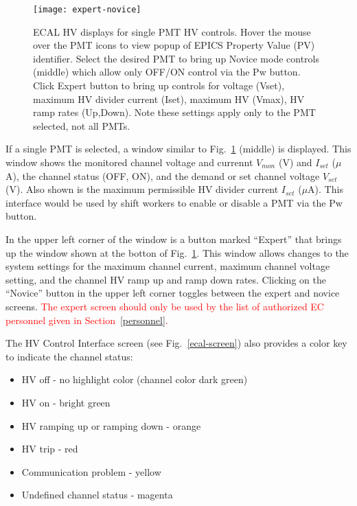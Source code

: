\documentclass[letterpaper,10pt]{article}
\begin{document}
\begin{figure}[htbp]
  \centering
  \texttt{[image: expert-novice]}
  \vspace{2mm}
  \caption{ECAL HV displays for single PMT HV controls.  Hover the mouse over the PMT icons to
    view popup of EPICS Property Value (PV) identifier. Select the desired PMT to bring up Novice
    mode controls (middle) which allow only OFF/ON control via the Pw button.  Click Expert button to
    bring up controls for voltage (Vset), maximum HV divider current (Iset), maximum HV (Vmax), HV ramp
  rates (Up,Down). Note these settings apply only to the PMT selected, not all PMTs.}
  \label{ecal-screen3}
\end{figure}

If a single PMT is selected, a window similar to Fig.~\ref{ecal-screen3} (middle) is displayed. This
window shows the monitored channel voltage and currennt $V_{mon}$ (V) and $I_{set}$ ($\mu$A), the channel status (OFF, ON),
and the demand or set channel voltage $V_{set}$ (V).  Also shown is the maximum permissible HV divider
current $I_{set}$ ($\mu$A).  This interface would be used by shift workers to enable or disable a
PMT via the Pw button.

In the upper left corner of the window is a button marked ``Expert'' that
brings up the window shown at the botton of Fig.~\ref{ecal-screen3}. This window allows changes to the system settings
for the maximum channel current, maximum channel voltage setting, and the channel HV ramp up and 
ramp down rates.   Clicking on the ``Novice'' button
in the upper left corner toggles between the 
expert and novice screens. \textcolor{red}{The expert screen should only be used by the list of 
authorized EC personnel given in Section~\ref{personnel}.} 

The HV Control Interface screen (see Fig.~\ref{ecal-screen}) also provides a color key to indicate 
the channel status:

\begin{itemize}
\item HV off - no highlight color (channel color dark green)
\item HV on - bright green
\item HV ramping up or ramping down - orange
\item HV trip - red
\item Communication problem - yellow
\item Undefined channel status - magenta
\end{itemize}
\end{document}
